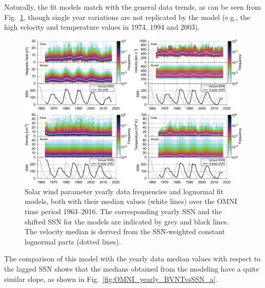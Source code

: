 \documentclass[]{aa}
\begin{document}
	Naturally, the fit models match with the general data trends, as can be seen from Fig.~\ref{fig:OMNI_yearly_BVdblNTSSN_fit_e_plot}, though single year variations are not replicated by the model (e.g., the high velocity and temperature values in 1974, 1994 and 2003).
	\begin{figure}
		\includegraphics[width=18cm]{figures/OMNI_yearly_BVdblNTSSN_fit_e_plot.pdf}
		\caption{Solar wind parameter yearly data frequencies and lognormal fit models, both with their median values (white lines) over the OMNI time period 1963--2016. The corresponding yearly SSN and the shifted SSN for the models are indicated by grey and black lines. The velocity median is derived from the SSN-weighted constant lognormal parts (dotted lines).}
		\label{fig:OMNI_yearly_BVdblNTSSN_fit_e_plot}
	\end{figure}
	The comparison of this model with the yearly data median values with respect to the lagged SSN shows that the medians obtained from the modeling have a quite similar slope, as shown in Fig.~\ref{fig:OMNI_yearly_BVNTvsSSN_a}.
\end{document}
